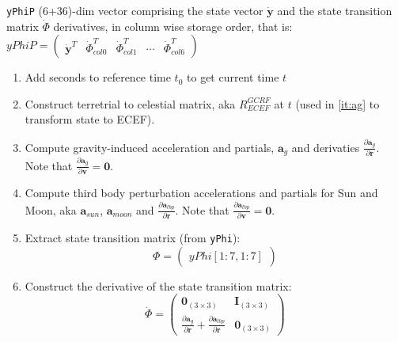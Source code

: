 \texttt{yPhiP} (6+36)-dim vector comprising the state vector 
$\dot{\bm{y}}$ and the state transition matrix $\dot{\Phi}$ derivatives, in 
column wise storage order, that is:
$yPhiP = \begin{pmatrix}
    \dot{\bm{y}}^T &  \dot{\Phi} ^T _{col0} & \dot{\Phi} ^T _{col1} & \cdots & \dot{\Phi} ^T _{col6}
\end{pmatrix}$

\begin{enumerate}
    \item Add seconds to reference time $t_0$ to get current time $t$
    
    \item Construct terretrial to celestial matrix, aka $R^{GCRF}_{ECEF}$ at 
        $t$ (used in \ref{it:ag} to transform state to ECEF).
    
    \item \label{it:ag} Compute gravity-induced acceleration and partials, 
        $\bm{a}_g$ and derivaties  
        $\frac{\partial \bm{a}_g}{\partial \bm{r}}$. Note that 
        $\frac{\partial \bm{a}_g}{\partial \bm{v}} = \bm{0}$.
    
    \item \label{it:atbp} Compute third body perturbation accelerations and 
        partials for Sun and Moon, aka $\bm{a}_{sun}$, $\bm{a}_{moon}$ and 
        $\frac{\partial \bm{a}_{tbp}}{\partial \bm{r}}$. Note that 
        $\frac{\partial \bm{a}_{tbp}}{\partial \bm{v}} = \bm{0}$.
    
    \item Extract state transition matrix (from \texttt{yPhi}):
        \begin{equation}
            \Phi = 
            \begin{pmatrix}
                yPhi[1:7, 1:7]
            \end{pmatrix}
        \end{equation}
    
    \item Construct the derivative of the state transition matrix:
        \begin{equation}
            \dot{\Phi} = 
            \begin{pmatrix}
                \bm{0}_{(3 \times 3)} & \bm{I}_{(3 \times 3)} \\
                \frac{\partial \bm{a}_g}{\partial \bm{r}} + 
                    \frac{\partial \bm{a}_{tbp}}{\partial \bm{r}} & \bm{0}_{(3 \times 3)}
            \end{pmatrix}
        \end{equation}
    

\end{enumerate}
